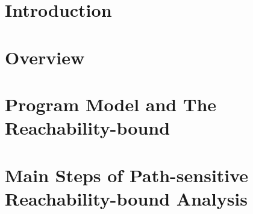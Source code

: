\documentclass[runningheads]{llncs}
\begin{document}
\section{Introduction}
\label{sec:intro}

\section{Overview}
\label{sec:overview}


\section{Program Model and The Reachability-bound}
\label{sec:preliminary}
% 



% 
% 
\section{Main Steps of Path-sensitive Reachability-bound Analysis}
\label{sec:static_rb}

\end{document}
